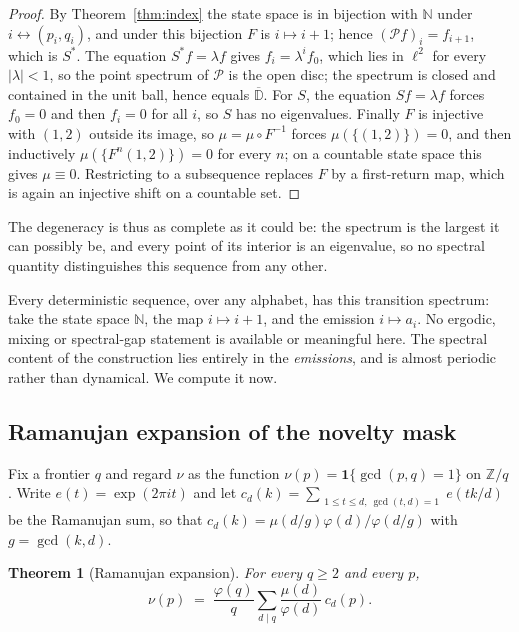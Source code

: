 \documentclass[11pt,a4paper]{article}
\theoremstyle{plain}
\newtheorem{theorem}{Theorem}[section]
\theoremstyle{definition}
\theoremstyle{remark}
\newcommand{\Z}{\mathbb{Z}}
\newcommand{\N}{\mathbb{N}}
\newcommand{\e}[1]{e\!\left(#1\right)}
\begin{document}
\begin{proof}
By Theorem~\ref{thm:index} the state space is in bijection with $\N$ under
$i \leftrightarrow (p_i,q_i)$, and under this bijection $F$ is $i \mapsto i+1$;
hence $(\mathcal{P}f)_i = f_{i+1}$, which is $S^*$. The equation
$S^* f = \lambda f$ gives $f_i = \lambda^i f_0$, which lies in $\ell^2$ for
every $|\lambda| < 1$, so the point spectrum of $\mathcal{P}$ is the open disc;
the spectrum is closed and contained in the unit ball, hence equals
$\overline{\mathbb{D}}$. For $S$, the equation $Sf = \lambda f$ forces
$f_0 = 0$ and then $f_i = 0$ for all $i$, so $S$ has no eigenvalues. Finally
$F$ is injective with $(1,2)$ outside its image, so $\mu = \mu \circ F^{-1}$
forces $\mu(\{(1,2)\}) = 0$, and then inductively $\mu(\{F^n(1,2)\}) = 0$ for
every $n$; on a countable state space this gives $\mu \equiv 0$. Restricting to
a subsequence replaces $F$ by a first-return map, which is again an injective
shift on a countable set.
\end{proof}

The degeneracy is thus as complete as it could be: the spectrum is the largest
it can possibly be, and every point of its interior is an eigenvalue, so no
spectral quantity distinguishes this sequence from any other.

Every deterministic sequence, over any alphabet, has this transition spectrum:
take the state space $\N$, the map $i \mapsto i+1$, and the emission
$i \mapsto a_i$. No ergodic, mixing or spectral-gap statement is available or
meaningful here. The spectral content of the construction lies entirely in the
\emph{emissions}, and is almost periodic rather than dynamical. We compute it
now.

\subsection{Ramanujan expansion of the novelty mask}

Fix a frontier $q$ and regard $\nu$ as the function
$\nu(p) = \mathbf{1}\{\gcd(p,q) = 1\}$ on $\Z/q$. Write
$\e{t} = \exp(2\pi i t)$ and let
$c_d(k) = \sum_{\substack{1\le t \le d,\ \gcd(t,d)=1}} \e{tk/d}$
be the Ramanujan sum, so that $c_d(k) = \mu(d/g)\varphi(d)/\varphi(d/g)$ with
$g = \gcd(k,d)$.

\begin{theorem}[Ramanujan expansion]\label{thm:ramanujan}
For every $q \ge 2$ and every $p$,
\begin{equation}\label{eq:ram}
  \nu(p) \;=\; \frac{\varphi(q)}{q} \sum_{d \mid q} \frac{\mu(d)}{\varphi(d)}\, c_d(p).
\end{equation}
\end{theorem}
\end{document}
